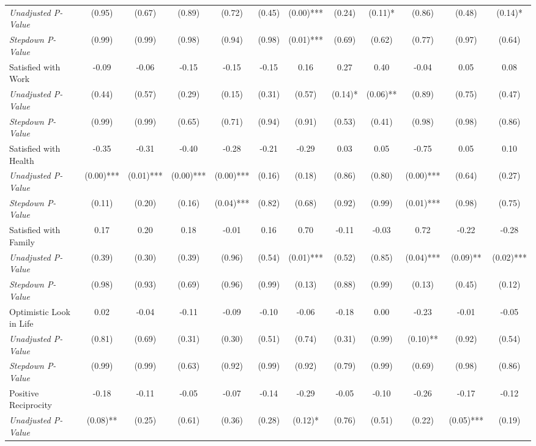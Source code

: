 \begin{tabular}{l c c c c c c c c c c c}
\quad \textit{Unadjusted P-Value} & (0.95) & (0.67) & (0.89) & (0.72) & (0.45) & (0.00)*** & (0.24) & (0.11)* & (0.86) & (0.48) & (0.14)* \\
\quad \textit{Stepdown P-Value} & (0.99) & (0.99) & (0.98) & (0.94) & (0.98) & (0.01)*** & (0.69) & (0.62) & (0.77) & (0.97) & (0.64) \\
Satisfied with Work & -0.09 & -0.06 & -0.15 & -0.15 & -0.15 & 0.16 & 0.27 & 0.40 & -0.04 & 0.05 & 0.08 \\
\quad \textit{Unadjusted P-Value} & (0.44) & (0.57) & (0.29) & (0.15) & (0.31) & (0.57) & (0.14)* & (0.06)** & (0.89) & (0.75) & (0.47) \\
\quad \textit{Stepdown P-Value} & (0.99) & (0.99) & (0.65) & (0.71) & (0.94) & (0.91) & (0.53) & (0.41) & (0.98) & (0.98) & (0.86) \\
Satisfied with Health & -0.35 & -0.31 & -0.40 & -0.28 & -0.21 & -0.29 & 0.03 & 0.05 & -0.75 & 0.05 & 0.10 \\
\quad \textit{Unadjusted P-Value} & (0.00)*** & (0.01)*** & (0.00)*** & (0.00)*** & (0.16) & (0.18) & (0.86) & (0.80) & (0.00)*** & (0.64) & (0.27) \\
\quad \textit{Stepdown P-Value} & (0.11) & (0.20) & (0.16) & (0.04)*** & (0.82) & (0.68) & (0.92) & (0.99) & (0.01)*** & (0.98) & (0.75) \\
Satisfied with Family & 0.17 & 0.20 & 0.18 & -0.01 & 0.16 & 0.70 & -0.11 & -0.03 & 0.72 & -0.22 & -0.28 \\
\quad \textit{Unadjusted P-Value} & (0.39) & (0.30) & (0.39) & (0.96) & (0.54) & (0.01)*** & (0.52) & (0.85) & (0.04)*** & (0.09)** & (0.02)*** \\
\quad \textit{Stepdown P-Value} & (0.98) & (0.93) & (0.69) & (0.96) & (0.99) & (0.13) & (0.88) & (0.99) & (0.13) & (0.45) & (0.12) \\
Optimistic Look in Life & 0.02 & -0.04 & -0.11 & -0.09 & -0.10 & -0.06 & -0.18 & 0.00 & -0.23 & -0.01 & -0.05 \\
\quad \textit{Unadjusted P-Value} & (0.81) & (0.69) & (0.31) & (0.30) & (0.51) & (0.74) & (0.31) & (0.99) & (0.10)** & (0.92) & (0.54) \\
\quad \textit{Stepdown P-Value} & (0.99) & (0.99) & (0.63) & (0.92) & (0.99) & (0.92) & (0.79) & (0.99) & (0.69) & (0.98) & (0.86) \\
Positive Reciprocity & -0.18 & -0.11 & -0.05 & -0.07 & -0.14 & -0.29 & -0.05 & -0.10 & -0.26 & -0.17 & -0.12 \\
\quad \textit{Unadjusted P-Value} & (0.08)** & (0.25) & (0.61) & (0.36) & (0.28) & (0.12)* & (0.76) & (0.51) & (0.22) & (0.05)*** & (0.19) \\

\end{tabular}
